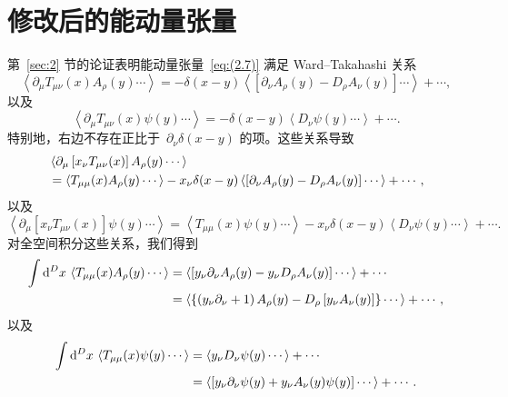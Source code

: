 \section{修改后的能动量张量}
\label{sec:E}
第~\ref{sec:2} 节的论证表明能动量张量~\eqref{eq:(2.7)} 满足 Ward--Takahashi 关系
\begin{equation}
   \left\langle\partial_\mu T_{\mu\nu}(x)A_\rho(y)\dotsm\right\rangle
   =-\delta(x-y)
   \left\langle\left[\partial_\nu A_\rho(y)
   -D_\rho A_\nu(y)\right]\dotsm\right\rangle+\dotsb,
\label{eq:(E1)}
\end{equation}
以及
\begin{equation}
   \left\langle\partial_\mu T_{\mu\nu}(x)\psi(y)\dotsm\right\rangle
   =-\delta(x-y)
   \left\langle D_\nu \psi(y)\dotsm\right\rangle+\dotsb.
\label{eq:(E2)}
\end{equation}
特别地，右边不存在正比于~$\partial_\nu\delta(x-y)$ 的项。这些关系导致
\begin{align}
   &\left\langle\partial_\mu\left[x_\nu T_{\mu\nu}(x)\right]
   A_\rho(y)\dotsm\right\rangle
\notag\\
   &=\left\langle T_{\mu\mu}(x)
   A_\rho(y)\dotsm\right\rangle
   -x_\nu\delta(x-y)
   \left\langle\left[\partial_\nu A_\rho(y)
   -D_\rho A_\nu(y)\right]\dotsm\right\rangle+\dotsb,
\label{eq:(E3)}
\end{align}
以及
\begin{equation}
   \left\langle\partial_\mu\left[x_\nu T_{\mu\nu}(x)\right]
   \psi(y)\dotsm\right\rangle
   =\left\langle T_{\mu\mu}(x)
   \psi(y)\dotsm\right\rangle
   -x_\nu\delta(x-y)
   \left\langle D_\nu \psi(y)\dotsm\right\rangle+\dotsb.
\label{eq:(E4)}
\end{equation}
对全空间积分这些关系，我们得到
\begin{align}
   \int\mathrm{d}^Dx\,
   \left\langle T_{\mu\mu}(x)
   A_\rho(y)\dotsm\right\rangle
   &=\left\langle\left[y_\nu\partial_\nu A_\rho(y)
   -y_\nu D_\rho A_\nu(y)\right]\dotsm\right\rangle+\dotsb
\notag\\
   &=\left\langle\left\{\left(y_\nu\partial_\nu+1\right) A_\rho(y)
   -D_\rho\left[y_\nu A_\nu(y)\right]\right\}\dotsm\right\rangle+\dotsb,
\label{eq:(E5)}
\end{align}
以及
\begin{align}
   \int\mathrm{d}^Dx\,\left\langle T_{\mu\mu}(x)
   \psi(y)\dotsm\right\rangle
   &=\left\langle y_\nu D_\nu \psi(y)\dotsm\right\rangle+\dotsb
\notag\\
   &=\left\langle\left[y_\nu\partial_\nu\psi(y)+y_\nu A_\nu(y)\psi(y)\right]
   \dotsm\right\rangle+\dotsb.
\label{eq:(E6)}
\end{align}

